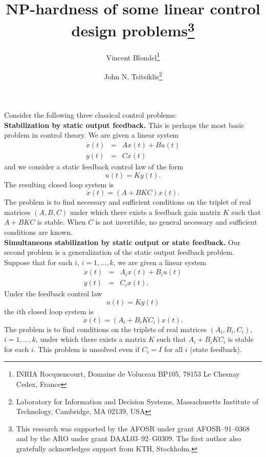 
\setlength{\textwidth}{15cm}	 
\setlength{\oddsidemargin}{0cm}	 
\setlength{\textheight}{22cm}	 
\setlength{\topmargin}{0cm}

\title{NP-hardness of some 
linear control design problems\thanks{This research was supported by the AFOSR under grant
AFOSR--91--0368 and by  the ARO under grant DAAL03--92--G0309. 
The first author also gratefully acknowledges support from
KTH, Stockholm.}}

\author{ Vincent Blondel\thanks{INRIA Rocquencourt, Domaine de Voluceau BP105, 78153 Le Chesnay Cedex, France}\and
John N. Tsitsiklis\thanks{Laboratory for Information and Decision 
Systems, Massachusetts Institute of Technology, Cambridge, MA 02139, USA} 
}

\newcommand{\C}{{\Bbb C}}
\newcommand{\R}{{\Bbb R}}
\newcommand{\Z}{{\Bbb Z}} 
\newcommand{\Db}{\overline{D}}
\newcommand{\ux}{\underline{x}}



\maketitle

Consider the following three classical control problems:\\

{\bf Stabilization by static output feedback.} This is perhaps the most
basic problem in control theory. We are given a linear system 
\begin{eqnarray*}
{\dot x}(t) 	& = 	& A x(t) + Bu(t)\\
y(t)	& = 	& Cx(t)
\end{eqnarray*}
and we consider a
static feedback control law  of the form
$$u(t)=K y(t).$$ The resulting closed loop system is
$${\dot x}(t)=(A+BKC) x(t).$$
The problem is 
to find necessary and sufficient 
conditions on the triplet of real matrices $(A, B, C)$ 
under which there exists a feedback gain  matrix $K$ such that $A+BK
C$ is stable. When $C$ is not invertible, 
no general necessary and sufficient conditions are known.\\

{\bf Simultaneous stabilization by static output or state feedback.}
Our second problem is a generalization of the static output
feedback problem. Suppose that for each $i$, $i=1,\ldots,k$, we are given
a linear system
\begin{eqnarray*}
{\dot x}(t) 	& = 	& A_i x(t) + B_iu(t)\\
y(t)	& = 	& C_ix(t).
\end{eqnarray*}
Under the feedback control law 
$$u(t)=K y(t)$$
the $i$th closed loop system is
$${\dot x}(t)=(A_i+B_iKC_i) x(t).$$
The problem is to find conditions on the triplets of real 
matrices $(A_i, B_i, C_i)$, $i=1,\ldots,k$, under which there
exists a matrix $K$ such that 
$A_i+B_iKC_i$ is stable for each $i$.
This problem is unsolved even if $C_i=I$ for all $i$ (state feedback).\\


